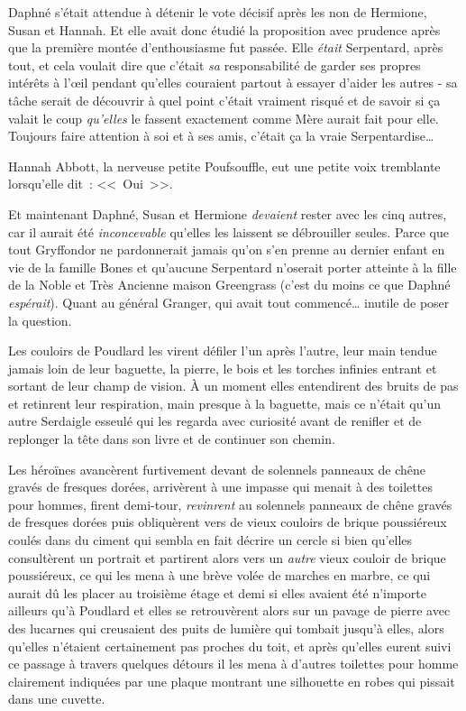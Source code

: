 Daphné s'était attendue à détenir le vote décisif après les non de Hermione, Susan et Hannah. Et elle avait donc étudié la proposition avec prudence après que la première montée d'enthousiasme fut passée. Elle \emph{était} Serpentard, après tout, et cela voulait dire que c'était \emph{sa} responsabilité de garder ses propres intérêts à l'œil pendant qu'elles couraient partout à essayer d'aider les autres - sa tâche serait de découvrir à quel point c'était vraiment risqué et de savoir si ça valait le coup \emph{qu'elles} le fassent exactement comme Mère aurait fait pour elle. Toujours faire attention à soi et à ses amis, c'était ça la vraie Serpentardise…

Hannah Abbott, la nerveuse petite Poufsouffle, eut une petite voix tremblante lorsqu'elle dit~: <<~Oui~>>.

Et maintenant Daphné, Susan et Hermione \emph{devaient} rester avec les cinq autres, car il aurait été \emph{inconcevable} qu'elles les laissent se débrouiller seules. Parce que tout Gryffondor ne pardonnerait jamais qu'on s'en prenne au dernier enfant en vie de la famille Bones et qu'aucune Serpentard n'oserait porter atteinte à la fille de la Noble et Très Ancienne maison Greengrass (c'est du moins ce que Daphné \emph{espérait}). Quant au général Granger, qui avait tout commencé… inutile de poser la question.

Les couloirs de Poudlard les virent défiler l'un après l'autre, leur main tendue jamais loin de leur baguette, la pierre, le bois et les torches infinies entrant et sortant de leur champ de vision. À un moment elles entendirent des bruits de pas et retinrent leur respiration, main presque à la baguette, mais ce n'était qu'un autre Serdaigle esseulé qui les regarda avec curiosité avant de renifler et de replonger la tête dans son livre et de continuer son chemin.

Les héroïnes avancèrent furtivement devant de solennels panneaux de chêne gravés de fresques dorées, arrivèrent à une impasse qui menait à des toilettes pour hommes, firent demi-tour, \emph{revinrent} au solennels panneaux de chêne gravés de fresques dorées puis obliquèrent vers de vieux couloirs de brique poussiéreux coulés dans du ciment qui sembla en fait décrire un cercle si bien qu'elles consultèrent un portrait et partirent alors vers un \emph{autre} vieux couloir de brique poussiéreux, ce qui les mena à une brève volée de marches en marbre, ce qui aurait dû les placer au troisième étage et demi si elles avaient été n'importe ailleurs qu'à Poudlard et elles se retrouvèrent alors sur un pavage de pierre avec des lucarnes qui creusaient des puits de lumière qui tombait jusqu'à elles, alors qu'elles n'étaient certainement pas proches du toit, et après qu'elles eurent suivi ce passage à travers quelques détours il les mena à d'autres toilettes pour homme clairement indiquées par une plaque montrant une silhouette en robes qui pissait dans une cuvette.

